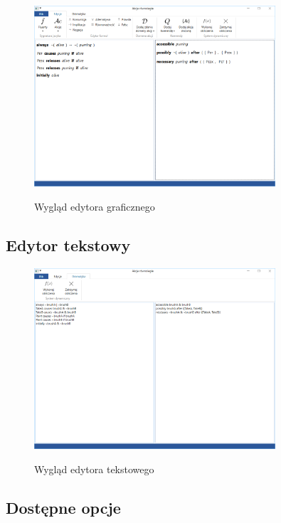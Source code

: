 \documentclass[11pt,a4paper]{article}
\begin{document}
\begin{figure}[H]
    \centering
    \includegraphics[width=0.8\textwidth]{res/img/visual-editor.png}
    \label{fig:visual-editor}
    \caption{Wygląd edytora graficznego}
\end{figure}

\subsection{Edytor tekstowy}

\begin{figure}[H]
    \centering
    \includegraphics[width=0.8\textwidth]{res/img/grammar-editor.png}
    \label{fig:grammar-editor}
    \caption{Wygląd edytora tekstowego}
\end{figure}

\subsection{Dostępne opcje}
\end{document}
